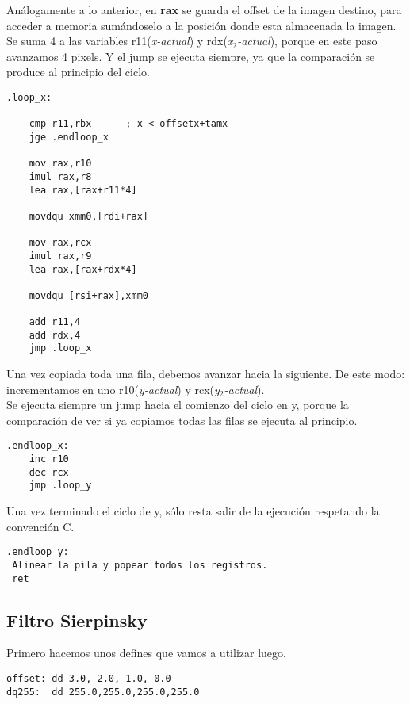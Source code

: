 \documentclass[a4paper]{article}
\begin{document}
\indent An\'alogamente a lo anterior, en \textbf{rax} se guarda el offset de la imagen destino, para acceder a memoria sum\'andoselo a la posici\'on donde esta almacenada la imagen. \\
\indent Se suma 4 a las variables r11(\emph{x-actual}) y rdx(\emph{x$_2$-actual}), porque en este paso avanzamos 4 pixels. Y el jump se ejecuta siempre, ya que la comparaci\'on se produce al principio del ciclo.
	  \begin{codesnippet}
\begin{verbatim}
.loop_x:

	cmp r11,rbx      ; x < offsetx+tamx
	jge .endloop_x

	mov rax,r10
	imul rax,r8
	lea rax,[rax+r11*4]

	movdqu xmm0,[rdi+rax]

	mov rax,rcx
	imul rax,r9
	lea rax,[rax+rdx*4]

	movdqu [rsi+rax],xmm0

	add r11,4
	add rdx,4
	jmp .loop_x	
\end{verbatim}
\end{codesnippet}

\indent Una vez copiada toda una fila, debemos avanzar hacia la siguiente. De este modo: incrementamos en uno r10(\emph{y-actual}) y rcx(\emph{y$_2$-actual}). \\
\indent Se ejecuta siempre un jump hacia el comienzo del ciclo en y, porque la comparaci\'on de ver si ya copiamos todas las filas se ejecuta al principio.
	  \begin{codesnippet}
\begin{verbatim}
.endloop_x:
	inc r10
	dec rcx
	jmp .loop_y
\end{verbatim}
\end{codesnippet}

\indent Una vez terminado el ciclo de y, s\'olo resta salir de la ejecuci\'on respetando la convenci\'on C.
	  \begin{codesnippet}
\begin{verbatim}
.endloop_y:
 Alinear la pila y popear todos los registros.
 ret
\end{verbatim}
\end{codesnippet}

\newpage
\subsection{Filtro Sierpinsky}

\indent Primero hacemos unos defines que vamos a utilizar luego.
 \begin{codesnippet}
\begin{verbatim}
offset: dd 3.0, 2.0, 1.0, 0.0
dq255:  dd 255.0,255.0,255.0,255.0
\end{verbatim}
\end{codesnippet}
\end{document}
